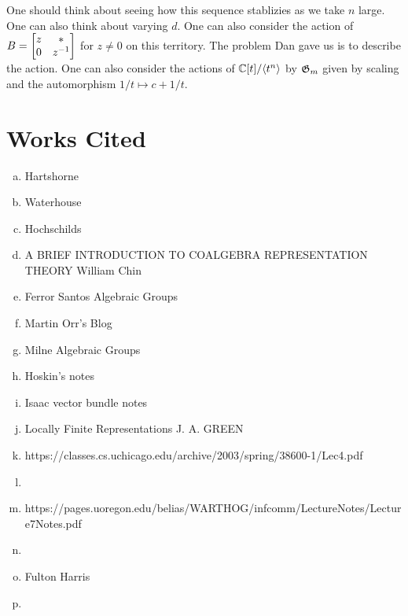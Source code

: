 \documentclass[12pt]{article}
\begin{document}
\begin{example}
    One should think about seeing how this sequence stablizies as we take $n$ large. One can also think about varying $d$. One can also consider the 
    action of $B = \begin{bmatrix}
        z & * \\
        0 & {z}^{-1}
    \end{bmatrix}$ for $z\neq 0$ on this territory. The problem Dan gave us is to describe the action. One can also consider the actions
    of $\mathbb{C}[t]/\langle{t^n}\rangle$ by $\mathfrak{G}_m$ given by scaling and the automorphism $1/t\mapsto c + 1/t$.
\end{example}
\section{Works Cited}
\begin{enumerate}[(a)]
    \item Hartshorne
    \item Waterhouse
    \item Hochschilds
    \item A BRIEF INTRODUCTION TO COALGEBRA REPRESENTATION THEORY William Chin
    \item Ferror Santos Algebraic Groups
    \item Martin Orr's Blog
    \item Milne Algebraic Groups
    \item Hoskin's notes
    \item Isaac vector bundle notes
    \item Locally Finite Representations J. A. GREEN
    \item https://classes.cs.uchicago.edu/archive/2003/spring/38600-1/Lec4.pdf
    \item %
    \item https://pages.uoregon.edu/belias/WARTHOG/infcomm/LectureNotes/Lecture7Notes.pdf
    \item %
    \item Fulton Harris
    \item %
\end{enumerate}
\end{document}
